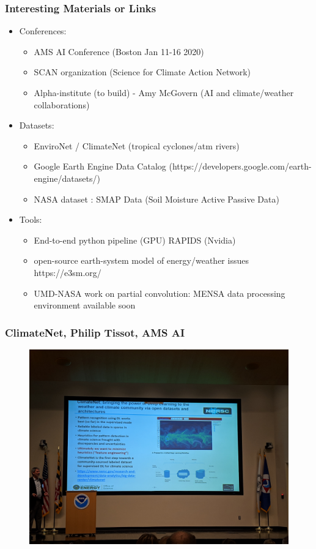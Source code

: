 \documentclass{beamer}
\begin{document}
\begin{frame}
\frametitle{Interesting Materials or Links}

\begin{itemize}
	\item Conferences: 
	\begin{itemize}
	\item AMS AI Conference (Boston Jan 11-16 2020)
	\item SCAN organization (Science for Climate Action Network)
	\item Alpha-institute (to build) - Amy McGovern (AI and climate/weather collaborations)
\end{itemize}		
	\item Datasets: 
	\begin{itemize}
	\item EnviroNet / ClimateNet (tropical cyclones/atm rivers)
	\item Google Earth Engine Data Catalog (https://developers.google.com/earth-engine/datasets/)
	\item NASA dataset : SMAP Data (Soil Moisture Active Passive Data)
	\end{itemize}		
	
	\item Tools: 
	\begin{itemize}
	\item End-to-end python pipeline (GPU) RAPIDS (Nvidia)
	\item open-source earth-system model of energy/weather issues https://e3sm.org/
	\item UMD-NASA work on partial convolution: MENSA data processing environment available soon
	\end{itemize}
	
\end{itemize}
\end{frame}

\begin{frame}
\frametitle{ClimateNet, Philip Tissot, AMS AI}
\begin{figure}
	\includegraphics[width=\linewidth]{figs/IMG_20190423_105340.jpg}
\end{figure}
\end{frame}
\end{document}
